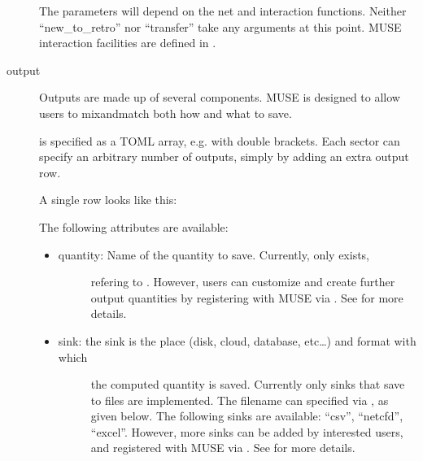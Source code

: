 \documentclass[letterpaper,10pt,english]{sphinxmanual}
\begin{document}
\begin{description}
The parameters will depend on the net and interaction functions. Neither
“new\_to\_retro” nor “transfer” take any arguments at this point. MUSE interaction
facilities are defined in .

\item[{output}] \leavevmode
Outputs are made up of several components. MUSE is designed to allow users to
mix\sphinxhyphen{}and\sphinxhyphen{}match both how and what to save.

 is specified as a TOML array, e.g. with double brackets. Each sector can
specify an arbitrary number of outputs, simply by adding an extra output row.

A single row looks like this:

\begin{sphinxVerbatim}[commandchars=\\\{\}]
  
  
  
  
\end{sphinxVerbatim}

The following attributes are available:
\begin{itemize}
\item {} \begin{description}
\item[{quantity: Name of the quantity to save. Currently, only  exists,}] \leavevmode
refering to . However, users can
customize and create further output quantities by registering with MUSE via
. See
 for more details.

\end{description}

\item {} \begin{description}
\item[{sink: the sink is the place (disk, cloud, database, etc…) and format with which}] \leavevmode
the computed quantity is saved. Currently only sinks that save to files are
implemented. The filename can specified via , as given below. The
following sinks are available: “csv”, “netcfd”, “excel”. However, more sinks can
be added by interested users, and registered with MUSE via
. See
 for more details.


\end{description}
\end{itemize}
\end{description}
\end{document}
